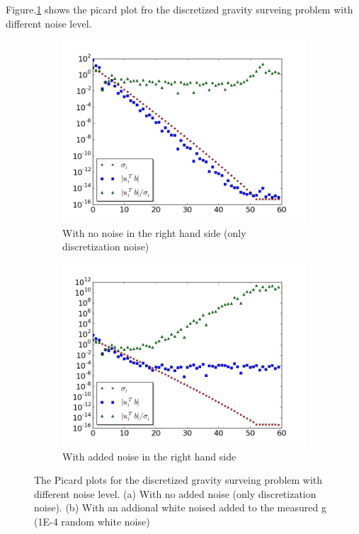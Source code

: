 \documentclass{article}
\begin{document}
Figure.\ref{fig:picard_plot} shows the picard plot fro the discretized gravity
surveing problem with different noise level.
\begin{figure}
	\centering
		\begin{subfigure}[b]{0.7\textwidth}
			\includegraphics[width=\textwidth]{images/PicardPlot/picardplot_without_noise}
			\caption{With
			no noise in the right hand side (only discretization noise)}
		\end{subfigure}
		\begin{subfigure}[b]{0.7\textwidth}
			\includegraphics[width=\textwidth]{images/PicardPlot/picardplot_with_noise}
			\caption{With
			added noise in the right hand side}
		\end{subfigure}
		\caption{The Picard plots for the discretized gravity
		surveing problem with different noise level. (a) With
		no added noise (only discretization noise). (b) With
		an addional white noised added to the measured g
		(1E-4 random white noise)}\label{fig:picard_plot}
\end{figure}
\end{document}
